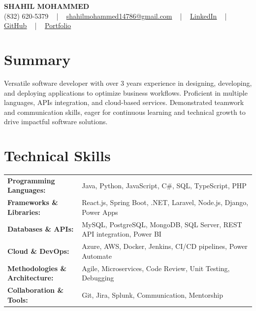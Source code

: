 \documentclass[letterpaper,11pt]{article}
\begin{document}
\begin{center}
    {\fontsize{14pt}{12pt}\selectfont \textbf{\MakeUppercase{Shahil Mohammed}}}\\ \vspace{2pt}
    \fontsize{10pt}{12pt}\selectfont (832) 620-5379 ~ | ~ \href{mailto:shahilmohammed14786@gmail.com}{shahilmohammed14786@gmail.com} ~ | ~  
    \href{https://www.linkedin.com/in/shahil-mohammed-9652931a1/}{\color{blue}\underline{LinkedIn}}  ~ | ~ 
    \href{https://github.com/freakbeast14}{\color{blue}\underline{GitHub}} ~ | ~ 
    \href{https://shahil-mohammed.netlify.app/}{\color{blue}\underline{Portfolio}}
    \vspace{-8pt}
\end{center}

\section{Summary}
\fontsize{9pt}{10pt}\selectfont
Versatile software developer with over 3 years experience in designing, developing, and deploying applications to optimize business workflows. Proficient in multiple languages, APIs integration, and cloud-based services. Demonstrated teamwork and communication skills, eager for continuous learning and technical growth to drive impactful software solutions.

 \vspace{-5pt}
 
\section{Technical Skills}
        \vspace{-14pt}
        \begin{table}[h]
            \fontsize{9pt}{10pt}\selectfont
            \begin{tabular}{p{0.3\linewidth} p{0.7\linewidth}}
                \textbf{Programming Languages:} & Java, Python, JavaScript, C\#, SQL, TypeScript, PHP \\
                \textbf{Frameworks \& Libraries:} & React.js, Spring Boot, .NET, Laravel, Node.js, Django, Power Apps \\
                \textbf{Databases \& APIs:} & MySQL, PostgreSQL, MongoDB, SQL Server, REST API integration, Power BI \\
                \textbf{Cloud \& DevOps:} & Azure, AWS, Docker, Jenkins, CI/CD pipelines, Power Automate \\
                \textbf{Methodologies \& Architecture:} & Agile, Microservices, Code Review, Unit Testing, Debugging \\
                \textbf{Collaboration \& Tools:} & Git, Jira, Splunk, Communication, Mentorship \\
            \end{tabular}
        \end{table}
 \vspace{-15pt}
 
\end{document}
